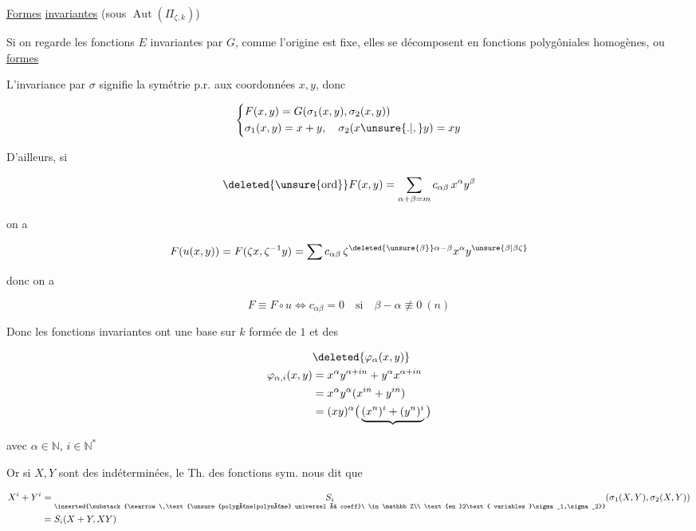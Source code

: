 \uline{Formes}  \uline{invariantes} (sous $\operatorname{Aut}(\Pi_{\zeta,k})$)

Si on regarde les fonctions    $E$ invariantes par $G$, comme l'origine est fixe, elles se décomposent en fonctions polygôniales homogènes,  ou \uline{formes}

L'invariance par $\sigma$ signifie la symétrie p.r. aux  coordonnées $x,y$, donc

\[\left\{\begin{aligned}
&F(x,y)=G(\sigma_1(x,y),\sigma_2(x,y))\\
&\sigma_1(x,y)=x+y,\quad \sigma_2(x\unsure{.|,}y)=xy
\end{aligned}\right.\]

D'ailleurs, si \unsure{;|,|{}}

\[\deleted{\unsure{\operatorname{ord}}}F(x,y)=\sum_{\alpha+\beta=m}c_{\alpha\beta}\,x^\alpha y^\beta\]

on a

\[F(u(x,y))=F(\zeta x,\zeta^{-1}y)=\sum c_{\alpha\beta}\,\zeta^{\deleted{\unsure{\beta}}\alpha-\beta}x^\alpha y^{\unsure{\beta|\beta\zeta}}\]

donc on a

\[F\equiv F\circ u\Longleftrightarrow c_{\alpha\beta}=0\quad\text{si}\quad\beta-\alpha\not\equiv0\ (n)\]


Donc les  fonctions  invariantes ont une base sur $k$ formée de $1$ et des

\[\begin{aligned}
&\deleted{\varphi_\alpha(x,y)}\\
\varphi_{\alpha,i}(x,y)&=x^\alpha y^{\alpha+in}+y^\alpha x^{\alpha+in}\\
&=x^\alpha y^\alpha(x^{in}+y^{in})\\
&=(xy)^\alpha\big(\underbrace{(x^n)^i+(y^n)^i}\big)
\end{aligned}\]

avec $\alpha\in\mathbb N$, $i\in\mathbb N^*$

 Or si $X,Y$ sont des indéterminées, le Th. des fonctions sym. nous dit que

\[\begin{aligned}
X^i+Y^i&=\underset{\inserted{\substack{\searrow\ \text{\unsure{polygône|polynôme} universel à coeff}\ \in\mathbb Z\\
\text{en }2\text{ variables }\sigma_1,\sigma_2}}}{S_i}(\sigma_1(X,Y),\sigma_2(X,Y))\\
&=S_i(X+Y,XY)
\end{aligned}\]

